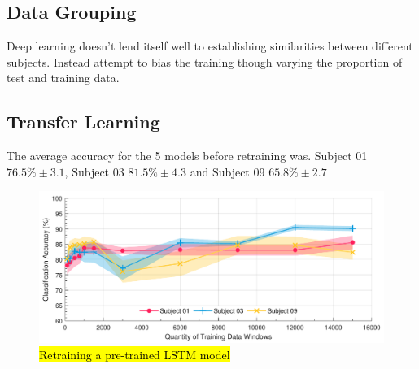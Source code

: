
\subsection{Data Grouping}
Deep learning doesn't lend itself well to establishing similarities between different subjects. Instead attempt to bias the training though varying the proportion of test and training data.



\subsection{Transfer Learning}
The average accuracy for the 5 models before retraining was.
Subject 01 $76.5\%\pm3.1$, Subject 03 $81.5\%\pm4.3$ and Subject 09 $65.8\%\pm2.7$




\begin{figure}[htbp]
    \centering
    \includegraphics[width=\textwidth]{content/5-Personalisation/ch5_pre_trained_model_accuracy.pdf}
    \caption[Retraining a pre-trained LSTM model]{\hl{Retraining a pre-trained LSTM model}}
    \label{fig:ch5_pretrained_model}
\end{figure}



